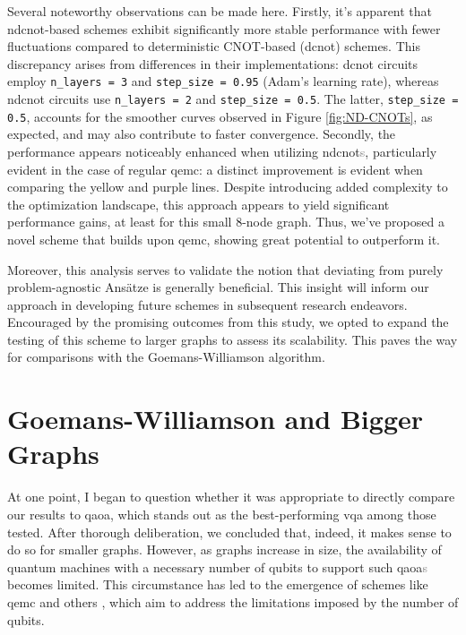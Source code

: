 Several noteworthy observations can be made here. Firstly, it's apparent that \acrshort{ndcnot}-based schemes exhibit significantly more stable performance with fewer fluctuations compared to deterministic CNOT-based (\acrshort{dcnot}) schemes. This discrepancy arises from differences in their implementations: \acrshort{dcnot} circuits employ \texttt{n\_layers = 3} and \texttt{step\_size = 0.95} (Adam's learning rate), whereas \acrshort{ndcnot} circuits use \texttt{n\_layers = 2} and \texttt{step\_size = 0.5}. The latter, \texttt{step\_size = 0.5}, accounts for the smoother curves observed in Figure \ref{fig:ND-CNOTs}, as expected, and may also contribute to faster convergence. Secondly, the performance appears noticeably enhanced when utilizing \acrshort{ndcnot}\textcolor{gray}{s}, particularly evident in the case of regular \acrshort{qemc}: a distinct improvement is evident when comparing the yellow and purple lines. Despite introducing added complexity to the optimization landscape, this approach appears to yield significant performance gains, at least for this small $8$-node graph. Thus, we've proposed a novel scheme that builds upon \acrshort{qemc}, showing great potential to outperform it.

Moreover, this analysis serves to validate the notion that deviating from purely problem-agnostic Ansätze is generally beneficial. This insight will inform our approach in developing future schemes in subsequent research endeavors. Encouraged by the promising outcomes from this study, we opted to expand the testing of this scheme to larger graphs to assess its scalability. This paves the way for comparisons with the Goemans-Williamson algorithm.





\vspace{-2.5mm}
\section{Goemans-Williamson and Bigger Graphs}
\label{section:GW_Bigger_Graphs}


At one point, I began to question whether it was appropriate to directly compare our results to \acrshort{qaoa}, which stands out as the best-performing \acrshort{vqa} among those tested. After thorough deliberation, we concluded that, indeed, it makes sense to do so for smaller graphs. However, as graphs increase in size, the availability of quantum machines with a necessary number of qubits to support such \acrshort{qaoa}\textcolor{gray}{s} becomes limited. This circumstance has led to the emergence of schemes like \acrshort{qemc} \cite{tenecohen2023variational} and others \cite{sciorilli2024largescale}, which aim to address the limitations imposed by the number of qubits.

